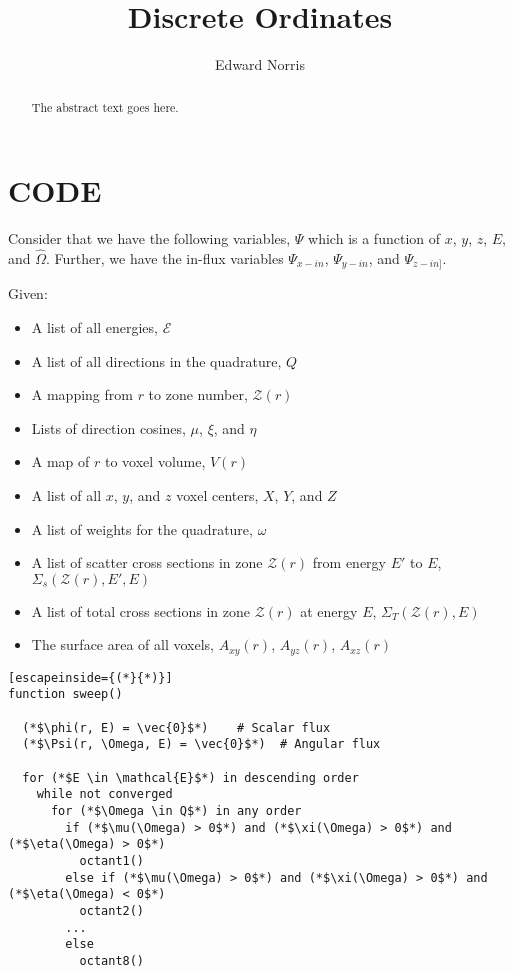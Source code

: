 \documentclass{article}
\numberwithin{equation}{subsection}
\begin{document}
\title{Discrete Ordinates}
\author{Edward Norris}

\maketitle

\begin{abstract}
The abstract text goes here.
\end{abstract}

\tableofcontents

\section{CODE}
Consider that we have the following variables, $\Psi$ which is a function of $x$, $y$, $z$, $E$, and $\hat{\Omega}$. Further, we have the in-flux variables $\Psi_{x-in}$, $\Psi_{y-in}$, and $\Psi_{z-in]}$. 

Given:
\begin{itemize}
\item A list of all energies, $\mathcal{E}$
\item A list of all directions in the quadrature, $Q$
\item A mapping from $r$ to zone number, $\mathcal{Z}(r)$
\item Lists of direction cosines, $\mu$, $\xi$, and $\eta$
\item A map of $r$ to voxel volume, $V(r)$
\item A list of all $x$, $y$, and $z$ voxel centers, $X$, $Y$, and $Z$
\item A list of weights for the quadrature, $\omega$
\item A list of scatter cross sections in zone $\mathcal{Z}(r)$ from energy $E'$ to $E$, $\Sigma_s(\mathcal{Z}(r), E', E)$
\item A list of total cross sections in zone $\mathcal{Z}(r)$ at energy $E$, $\Sigma_T(\mathcal{Z}(r), E)$
\item The surface area of all voxels, $A_{xy}(r)$, $A_{yz}(r)$, $A_{xz}(r)$
\end{itemize}

\pagebreak
\begin{lstlisting}[escapeinside={(*}{*)}]
function sweep()

  (*$\phi(r, E) = \vec{0}$*)    # Scalar flux
  (*$\Psi(r, \Omega, E) = \vec{0}$*)  # Angular flux
  
  for (*$E \in \mathcal{E}$*) in descending order
    while not converged
      for (*$\Omega \in Q$*) in any order
        if (*$\mu(\Omega) > 0$*) and (*$\xi(\Omega) > 0$*) and (*$\eta(\Omega) > 0$*)
          octant1()
        else if (*$\mu(\Omega) > 0$*) and (*$\xi(\Omega) > 0$*) and (*$\eta(\Omega) < 0$*)
          octant2()
        ...
        else
          octant8()
\end{lstlisting}
\end{document}

